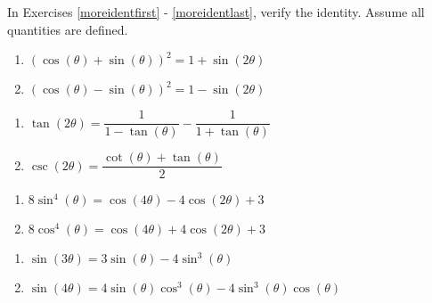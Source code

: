 In Exercises \ref{moreidentfirst} - \ref{moreidentlast}, verify the identity.  Assume all quantities are defined.

\begin{multicols}{2}

\begin{enumerate}

\setcounter{enumi}{\value{HW}}

\item  $(\cos(\theta) + \sin(\theta))^2 = 1 + \sin(2\theta)$ \label{moreidentfirst}
\item  $(\cos(\theta) - \sin(\theta))^2 = 1 - \sin(2\theta)$

\setcounter{HW}{\value{enumi}}

\end{enumerate}

\end{multicols}

\begin{multicols}{2}

\begin{enumerate}

\setcounter{enumi}{\value{HW}}

\item  $\tan(2\theta) = \dfrac{1}{1-\tan(\theta)} - \dfrac{1}{1+\tan(\theta)}$
\item  $\csc(2\theta) = \dfrac{\cot(\theta) + \tan(\theta)}{2}$

\setcounter{HW}{\value{enumi}}

\end{enumerate}

\end{multicols}

\begin{multicols}{2}

\begin{enumerate}

\setcounter{enumi}{\value{HW}}

\item  $8 \sin^{4}(\theta) = \cos(4\theta) - 4\cos(2\theta)+3$
\item  $8 \cos^{4}(\theta) = \cos(4\theta) + 4\cos(2\theta)+3$

\setcounter{HW}{\value{enumi}}

\end{enumerate}

\end{multicols}

\begin{multicols}{2}

\begin{enumerate}

\setcounter{enumi}{\value{HW}}

\item \label{sine3theta} $\sin(3\theta) = 3\sin(\theta) - 4\sin^{3}(\theta)$
\item  $\sin(4\theta) = 4\sin(\theta)\cos^{3}(\theta) - 4\sin^{3}(\theta)\cos(\theta)$

\setcounter{HW}{\value{enumi}}

\end{enumerate}

\end{multicols}


